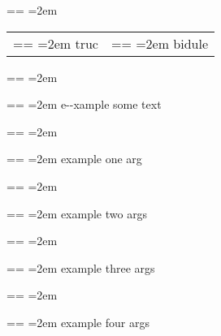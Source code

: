 \documentclass{book}
\makeatletter
\newenvironment{GNUTexinfopreformatted}{%
  \par\obeylines\obeyspaces\frenchspacing
  \parskip=\z@\parindent=\z@}{}
\makeatother
\begin{document}
\begin{GNUTexinfopreformatted}
\leftskip=2em\relax\ttfamily%

\end{GNUTexinfopreformatted}
\begin{tabular}{m{} m{}}%
\begin{GNUTexinfopreformatted}
\leftskip=2em\relax\ttfamily%
truc \end{GNUTexinfopreformatted}&
\begin{GNUTexinfopreformatted}
\leftskip=2em\relax\ttfamily%
bidule
\end{GNUTexinfopreformatted}\\
\end{tabular}%
\begin{GNUTexinfopreformatted}
\leftskip=2em\relax\ttfamily%

\end{GNUTexinfopreformatted}
\begin{GNUTexinfopreformatted}
\leftskip=2em\relax\ttfamily%
e{-}{-}xample  some
   text
\end{GNUTexinfopreformatted}
\begin{GNUTexinfopreformatted}
\leftskip=2em\relax\ttfamily%

\end{GNUTexinfopreformatted}
\begin{GNUTexinfopreformatted}
\leftskip=2em\relax\ttfamily%
example one arg
\end{GNUTexinfopreformatted}
\begin{GNUTexinfopreformatted}
\leftskip=2em\relax\ttfamily%

\end{GNUTexinfopreformatted}
\begin{GNUTexinfopreformatted}
\leftskip=2em\relax\ttfamily%
example two args
\end{GNUTexinfopreformatted}
\begin{GNUTexinfopreformatted}
\leftskip=2em\relax\ttfamily%

\end{GNUTexinfopreformatted}
\begin{GNUTexinfopreformatted}
\leftskip=2em\relax\ttfamily%
example three args
\end{GNUTexinfopreformatted}
\begin{GNUTexinfopreformatted}
\leftskip=2em\relax\ttfamily%

\end{GNUTexinfopreformatted}
\begin{GNUTexinfopreformatted}
\leftskip=2em\relax\ttfamily%
example four args
\end{GNUTexinfopreformatted}
\end{document}
